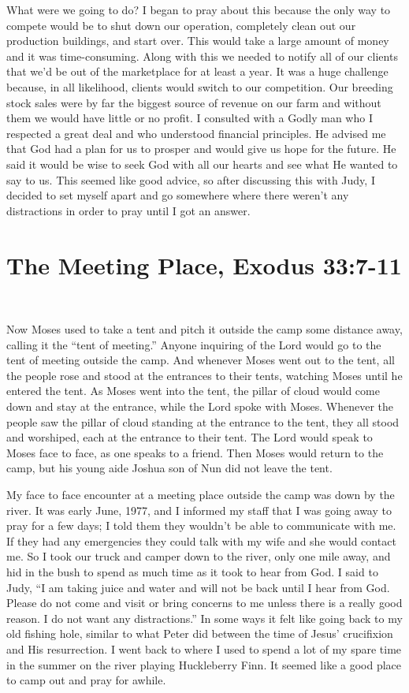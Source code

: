 \documentclass[oneside]{book}
\begin{document}
What were we going to do? I began to pray about this because the only way to compete would be to shut down our operation, completely clean out our production buildings, and start over. This would take a large amount of money and it was time-consuming. Along with this we needed to notify all of our clients that we'd be out of the marketplace for at least a year. It was a huge challenge because, in all likelihood, clients would switch to our competition. Our breeding stock sales were by far the biggest source of revenue on our farm and without them we would have little or no profit. I consulted with a Godly man who I respected a great deal and who understood financial principles. He advised me that God had a plan for us to prosper and would give us hope for the future. He said it would be wise to seek God with all our hearts and see what He wanted to say to us. This seemed like good advice, so after discussing this with Judy, I decided to set myself apart and go somewhere where there weren’t any distractions in order to pray until I got an answer.


\section{The Meeting Place, Exodus 33:7-11}
\

Now Moses used to take a tent and pitch it outside the camp some distance away, calling it the “tent of meeting.” Anyone inquiring of the Lord would go to the tent of meeting outside the camp. And whenever Moses went out to the tent, all the people rose and stood at the entrances to their tents, watching Moses until he entered the tent. As Moses went into the tent, the pillar of cloud would come down and stay at the entrance, while the Lord spoke with Moses. Whenever the people saw the pillar of cloud standing at the entrance to the tent, they all stood and worshiped, each at the entrance to their tent. The Lord would speak to Moses face to face, as one speaks to a friend. Then Moses would return to the camp, but his young aide Joshua son of Nun did not leave the tent.

My face to face encounter at a meeting place outside the camp was down by the river. It was early June, 1977, and I informed my staff that I was going away to pray for a few days; I told them they wouldn't be able to communicate with me. If they had any emergencies they could talk with my wife and she would contact me. So I took our truck and camper down to the river, only one mile away, and hid in the bush to spend as much time as it took to hear from God. I said to Judy, “I am taking juice and water and will not be back until I hear from God. Please do not come and visit or bring concerns to me unless there is a really good reason. I do not want any distractions.” In some ways it felt like going back to my old fishing hole, similar to what Peter did between the time of Jesus' crucifixion and His resurrection. I went back to where I used to spend a lot of my spare time in the summer on the river playing Huckleberry Finn. It seemed like a good place to camp out and pray for awhile.
\end{document}
